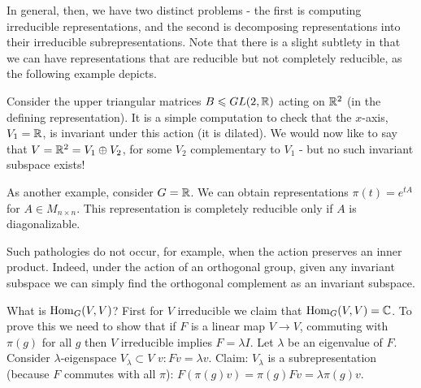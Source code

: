 \documentclass{../mathnotes}
\begin{document}
In general, then, we have two distinct problems - the first is computing irreducible representations, and the second is decomposing
representations into their irreducible subrepresentations.
Note that there is a slight subtlety in that we can have representations that are reducible
but not completely reducible, as the following example depicts.

\begin{exmp}
    Consider the upper triangular matrices $B\leqslant GL(2,\mathbb{R})$ acting on $\mathbb{R}^2$ (in the defining representation). It is a simple computation to check that the $x$-axis,
    $V_1=\mathbb{R}$, is invariant under this action (it is dilated). We would now like to say that $V=\mathbb{R}^2=V_1\oplus V_2$, for some $V_2$ complementary to $V_1$ - 
    but no such invariant subspace exists!

    As another example, consider $G=\mathbb{R}$. We can obtain representations $\pi(t)=e^{tA}$ for $A\in M_{n\times n}$. This representation
    is completely reducible only if $A$ is diagonalizable.

    Such pathologies do not occur, for example, when the action preserves an inner product. Indeed, under the action of an orthogonal group, given any invariant subspace
    we can simply find the orthogonal complement as an invariant subspace.
\end{exmp}

What is $\operatorname{Hom}_G(V,V)$? First for $V$ irreducible we claim that $\operatorname{Hom}_G(V,V)=\mathbb{C}$. To prove this we need to show that if $F$ is a linear map $V\to V$,
commuting with $\pi(g)$ for all $g$ then $V$ irreducible implies $F=\lambda I$. Let $\lambda$ be an eigenvalue of $F$. Consider $\lambda$-eigenspace $V_\lambda\subset V$
$v:Fv=\lambda v$. Claim: $V_\lambda$ is a subrepresentation (because $F$ commutes with all $\pi$): $F(\pi(g)v)=\pi(g)Fv=\lambda \pi(g)v$.
\end{document}
